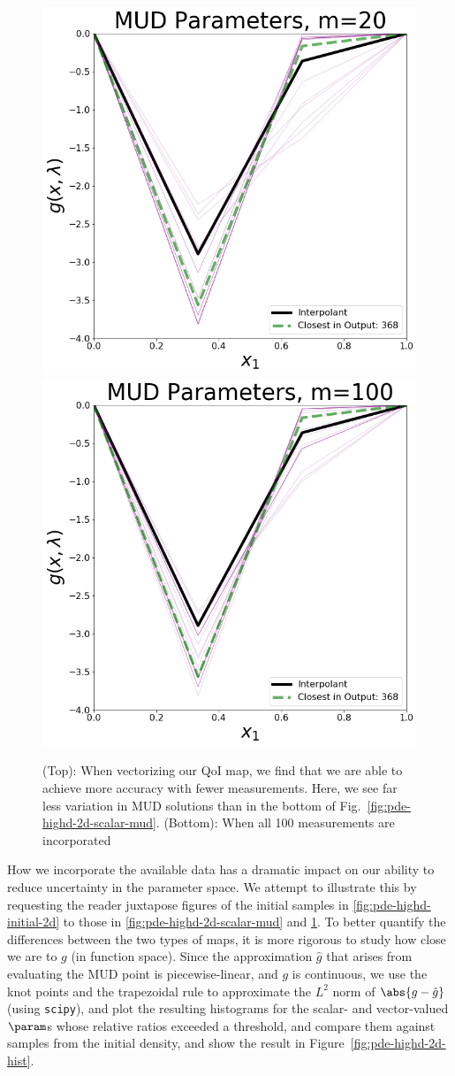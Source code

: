 \begin{figure}[htbp]
\centering
  \includegraphics[width=0.6\linewidth]{figures/pde-highd/pde-highd_pair_D2-2_m20.png}
  \includegraphics[width=0.6\linewidth]{figures/pde-highd/pde-highd_pair_D2-2_m100.png}
\caption{
(Top): When vectorizing our QoI map, we find that we are able to achieve more accuracy with fewer measurements. Here, we see far less variation in MUD solutions than in the bottom of Fig.~\ref{fig:pde-highd-2d-scalar-mud}.
(Bottom): When all 100 measurements are incorporated
}
\label{fig:pde-highd-2d-vector-mud}
\end{figure}

How we incorporate the available data has a dramatic impact on our ability to reduce uncertainty in the parameter space.
We attempt to illustrate this by requesting the reader juxtapose figures of the initial samples in \ref{fig:pde-highd-initial-2d} to those in \ref{fig:pde-highd-2d-scalar-mud} and \ref{fig:pde-highd-2d-vector-mud}.
To better quantify the differences between the two types of maps, it is more rigorous to study how close we are to $g$ (in function space).
Since the approximation $\hat{g}$ that arises from evaluating the MUD point is piecewise-linear, and $g$ is continuous, we use the knot points and the trapezoidal rule to approximate the $L^2$ norm of $\abs{g - \hat{g}}$ (using {\tt scipy}), and plot the resulting histograms for the scalar- and vector-valued $\param$s whose relative ratios exceeded a threshold, and compare them against samples from the initial density, and show the result in Figure~\ref{fig:pde-highd-2d-hist}.


